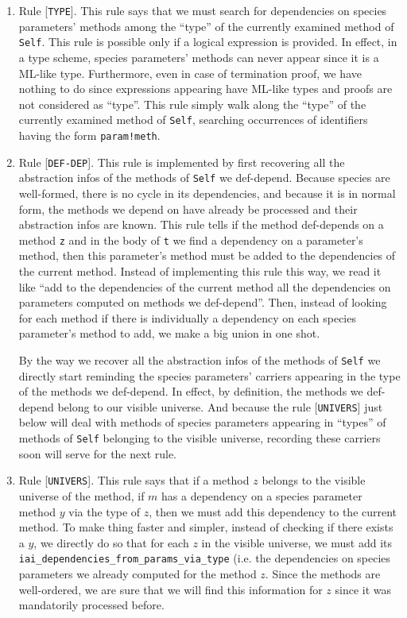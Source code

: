 \begin{enumerate}
\item Rule [{\tt TYPE}].
  This rule says that we must search for
  dependencies on species parameters' methods among the ``type'' of
  the currently examined method of {\tt Self}. This rule is possible
  only if a logical expression is provided. In effect, in a type
  scheme, species parameters' methods can never appear since it is a
  ML-like type. Furthermore, even in case of termination proof, we
  have nothing to do since expressions appearing have ML-like types
  and proofs are not considered as ``type''. This rule simply walk
  along  the ``type'' of the currently examined method of {\tt Self},
  searching occurrences of identifiers having the form
  {\tt param!meth}.

\item Rule [{\tt DEF-DEP}].
  This rule is implemented by first
  recovering all the abstraction infos of the methods of {\tt Self} we
  def-depend. Because species are well-formed, there is no cycle in
  its dependencies, and because it is in normal form, the methods we
  depend on have already be processed and their abstraction infos are
  known. This rule tells if the method def-depends on a method {\tt z}
  and in the body of {\tt t} we find a dependency on a parameter's
  method, then this parameter's method must be added to the
  dependencies of the current method. Instead of implementing this
  rule this way, we read it like ``add to the dependencies of the
  current method all the dependencies on parameters computed on
  methods we def-depend''. Then, instead of looking for each method if
  there is individually a dependency on each species parameter's
  method to add, we make a big union in one shot.

  By the way we recover all the abstraction infos of the methods of
  {\tt Self} we directly start reminding the species parameters'
  carriers appearing in the type of the methods we def-depend. In
  effect, by definition, the methods we def-depend belong to our
  visible universe. And because the rule [{\tt UNIVERS}] just below
  will deal with methods of species parameters appearing in ``types''
  of methods of {\tt Self} belonging to the visible universe,
  recording these carriers soon will serve for the next rule.

\item Rule [{\tt UNIVERS}].
  This rule says that if a method $z$
  belongs to the visible universe of the method, if $m$ has a
  dependency on a species parameter method $y$ via the type of $z$,
  then we must add this dependency to the current method.
  To make thing faster and simpler, instead of checking if there
  exists a $y$, we directly do so that for each $z$ in the visible
  universe, we must add its
  {\tt iai\_dependencies\_from\_params\_via\_type} (i.e. the dependencies
  on species parameters we already computed for the method $z$. Since
  the methods are well-ordered, we are sure that we will find this
  information for $z$ since it was mandatorily processed before.


\end{enumerate}

